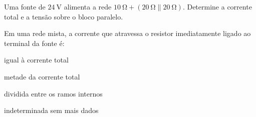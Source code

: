 \begin{questao}[1]{}

Uma fonte de $\SI{24}{\volt}$ alimenta a rede
$\SI{10}{\ohm}+(\SI{20}{\ohm}\parallel\SI{20}{\ohm})$. Determine a corrente
total e a tensão sobre o bloco paralelo.


\end{questao}
\begin{questao}[1]{}

Em uma rede mista, a corrente que atravessa o resistor imediatamente ligado ao
terminal da fonte é:
\begin{alternativas}[2]
\item igual à corrente total
\item metade da corrente total
\item dividida entre os ramos internos
\item indeterminada sem mais dados
\end{alternativas}


\end{questao}

